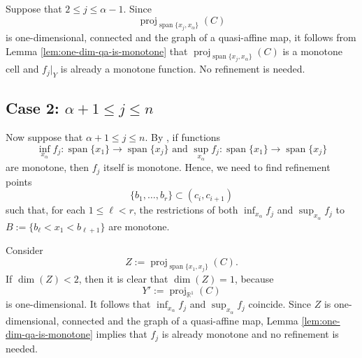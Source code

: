 \documentclass[
]{book}
\theoremstyle{definition}
\theoremstyle{definition}
\theoremstyle{definition}
\theoremstyle{definition}
\theoremstyle{remark}
\begin{document}
Suppose that \(2 \le j \le \alpha - 1\).
Since
\[
{\operatorname{proj}_{{\operatorname{span} \{x_j,x_\alpha\}}}}(C)
\]
is one-dimensional, connected and the graph of a quasi-affine map, it follows from Lemma \ref{lem:one-dim-qa-is-monotone} that \({\operatorname{proj}_{{\operatorname{span} \{x_j,x_\alpha\}}}}(C)\) is a monotone cell and \(f_j\vert_Y\) is already a monotone function. No refinement is needed.

\hypertarget{case-2-alpha-1-le-j-le-n}{%
\subsection{\texorpdfstring{Case 2: \(\alpha + 1 \le j \le n\)}{Case 2: \textbackslash alpha + 1 \textbackslash le j \textbackslash le n}}\label{case-2-alpha-1-le-j-le-n}}

Now suppose that \(\alpha + 1 \le j \le n\).
By \citep[Theorem 3]{bgv13}, if functions \[\inf_{x_\alpha} f_j : {\operatorname{span} \{x_1\}} \to {\operatorname{span} \{x_j\}} \text{ and } \sup_{x_\alpha} f_j : {\operatorname{span} \{x_1\}} \to {\operatorname{span} \{x_j\}}\] are monotone, then \(f_j\) itself is monotone.
Hence, we need to find refinement points
\[
\{ b_1,\ldots,b_r \} \subset (c_i,c_{i+1})
\]
such that, for each \(1\le \ell < r\), the restrictions of both \(\inf_{x_\alpha} f_j\) and \(\sup_{x_\alpha} f_j\) to \(B := \{ b_\ell < x_1 < b_{\ell + 1} \}\) are monotone.

Consider \[
Z := {\operatorname{proj}_{{\operatorname{span} \{x_1,x_j\}}}}(C).
\]
If \(\dim(Z) < 2\), then it is clear that \(\dim(Z) = 1\), because
\[
Y' := {\operatorname{proj}_{\mathbb{R}^{1}}}(C)
\] is one-dimensional.
It follows that \(\inf_{x_\alpha} f_j\) and \(\sup_{x_\alpha} f_j\) coincide. Since \(Z\) is one-dimensional, connected and the graph of a quasi-affine map, Lemma \ref{lem:one-dim-qa-is-monotone} implies that \(f_j\) is already monotone and no refinement is needed.
\end{document}
